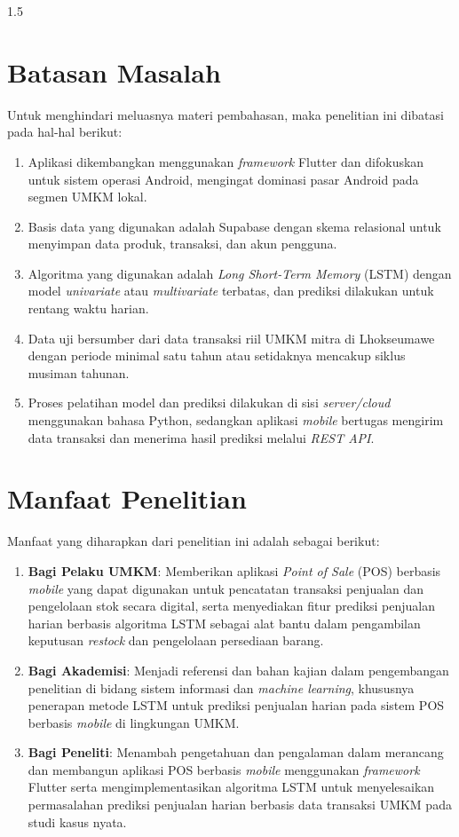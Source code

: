 \documentclass[12pt, a4paper, onecolumn, oneside]{report}
\begin{document}
\begin{spacing}{1.5}
\section{Batasan Masalah}
Untuk menghindari meluasnya materi pembahasan, maka penelitian ini dibatasi pada hal-hal berikut:
\begin{enumerate}
    \item Aplikasi dikembangkan menggunakan \textit{framework} Flutter dan difokuskan untuk sistem operasi Android, mengingat dominasi pasar Android pada segmen UMKM lokal.
    \item Basis data yang digunakan adalah Supabase dengan skema relasional untuk menyimpan data produk, transaksi, dan akun pengguna.
    \item Algoritma yang digunakan adalah \textit{Long Short-Term Memory} (LSTM) dengan model \textit{univariate} atau \textit{multivariate} terbatas, dan prediksi dilakukan untuk rentang waktu harian.
    \item Data uji bersumber dari data transaksi riil UMKM mitra di Lhokseumawe dengan periode minimal satu tahun atau setidaknya mencakup siklus musiman tahunan.
    \item Proses pelatihan model dan prediksi dilakukan di sisi \textit{server/cloud} menggunakan bahasa Python, sedangkan aplikasi \textit{mobile} bertugas mengirim data transaksi dan menerima hasil prediksi melalui \textit{REST API}.
\end{enumerate}

\section{Manfaat Penelitian}
Manfaat yang diharapkan dari penelitian ini adalah sebagai berikut:
\begin{enumerate}
    \item \textbf{Bagi Pelaku UMKM}: Memberikan aplikasi \textit{Point of Sale} (POS) berbasis \textit{mobile} yang dapat digunakan untuk pencatatan transaksi penjualan dan pengelolaan stok secara digital, serta menyediakan fitur prediksi penjualan harian berbasis algoritma LSTM sebagai alat bantu dalam pengambilan keputusan \textit{restock} dan pengelolaan persediaan barang.
    \item \textbf{Bagi Akademisi}: Menjadi referensi dan bahan kajian dalam pengembangan penelitian di bidang sistem informasi dan \textit{machine learning}, khususnya penerapan metode LSTM untuk prediksi penjualan harian pada sistem POS berbasis \textit{mobile} di lingkungan UMKM.
    \item \textbf{Bagi Peneliti}: Menambah pengetahuan dan pengalaman dalam merancang dan membangun aplikasi POS berbasis \textit{mobile} menggunakan \textit{framework} Flutter serta mengimplementasikan algoritma LSTM untuk menyelesaikan permasalahan prediksi penjualan harian berbasis data transaksi UMKM pada studi kasus nyata.
\end{enumerate}


\end{spacing}
\end{document}
